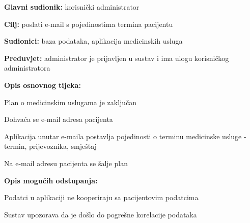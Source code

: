      			\noindent {}
					\begin{packed_item}
	
						\item \textbf{Glavni sudionik: }korisnički administrator
						\item  \textbf{Cilj:} poslati e-mail s pojedinostima termina pacijentu
						\item  \textbf{Sudionici:} baza podataka, aplikacija medicinskih usluga
						\item  \textbf{Preduvjet:} administrator je prijavljen u sustav i ima ulogu korisničkog administratora 
						\item  \textbf{Opis osnovnog tijeka:}
						
						\item[] \begin{packed_enum}
	
							\item Plan o medicinskim uslugama je zaključan
       				\item Dohvaća se e-mail adresa pacijenta
       				\item Aplikacija unutar e-maila postavlja pojedinosti o terminu medicinske usluge - termin, prijevoznika, smještaj
	   			\item Na e-mail adresu pacijenta se šalje plan
						\end{packed_enum}

      						\item  \textbf{Opis mogućih odstupanja:}
						
						\item[] \begin{packed_item}
	
							\item[3.a] Podatci u aplikaciji ne kooperiraju sa pacijentovim podatcima
							\item[] \begin{packed_enum}
								
								\item Sustav upozorava da je došlo do pogrešne korelacije podataka
								
							\end{packed_enum}
							
						\end{packed_item}
						
					\end{packed_item}
                        
				
					
